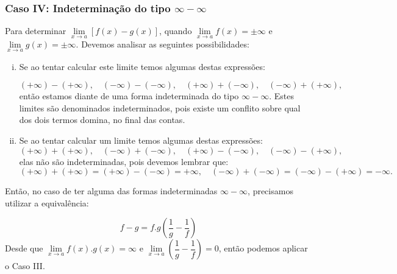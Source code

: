 \cleardoublepage\documentclass[../main.tex]{subfiles}
\begin{document}
\subsubsection*{Caso IV: Indeterminação do tipo $\infty - \infty$}
Para determinar \(\lim\limits_{x\to a}[f(x)-g(x)]\), quando \(\lim\limits_{x\to a}f(x)=\pm\infty\) e \(\lim\limits_{x\to a}g(x)=\pm\infty\). Devemos analisar as seguintes possibilidades:
\begin{enumerate}[i.]
    \item Se ao tentar calcular este limite temos algumas destas expressões:

\[ (+\infty)-(+\infty),\quad (-\infty)-(-\infty),\quad (+\infty)+(-\infty),\quad (-\infty)+(+\infty), \]
então estamos diante de uma forma indeterminada do tipo \(\infty- \infty\). Estes limites são denominados indeterminados, pois existe um conflito sobre qual dos dois termos domina, no final das contas.
\item Se ao tentar calcular um limite temos algumas destas expressões:
\[ (+\infty)+(+\infty),\quad (-\infty)+(-\infty),\quad (+\infty)-(-\infty),\quad (-\infty)-(+\infty), \]
elas não são indeterminadas, pois devemos lembrar que:
\[ (+\infty)+(+\infty)=(+\infty)-(-\infty)=+\infty,\quad (-\infty)+(-\infty)= (-\infty)-(+\infty)=-\infty. \]
\end{enumerate}
Então, no caso de ter alguma das formas indeterminadas \(\infty- \infty\), precisamos utilizar a equivalência:

\[ f-g=f.g\left(\dfrac{1}{g}-\dfrac{1}{f}\right) \]
Desde que \(\lim\limits_{x\to a}f(x).g(x)=\infty\) e \(\lim\limits_{x\to a}\left(\dfrac{1}{g}-\dfrac{1}{f}\right)=0\), então podemos aplicar o Caso III.
\end{document}
